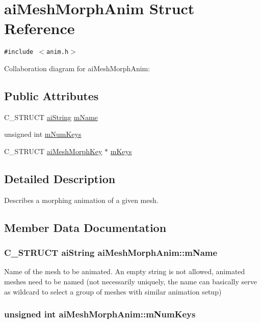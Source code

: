 \hypertarget{structai_mesh_morph_anim}{
\section{aiMeshMorphAnim Struct Reference}
\label{structai_mesh_morph_anim}
}
{\tt \#include $<$anim.h$>$}

Collaboration diagram for aiMeshMorphAnim:\subsection*{Public Attributes}
\begin{CompactItemize}
\item 
C\_\-STRUCT \hyperlink{structai_string}{aiString} \hyperlink{structai_mesh_morph_anim_21de91fb9c9fcf58a0bd0c761ea25cf5}{mName}
\item 
unsigned int \hyperlink{structai_mesh_morph_anim_f9c8a3e37613a196ed33d2746cf6f0c8}{mNumKeys}
\item 
C\_\-STRUCT \hyperlink{structai_mesh_morph_key}{aiMeshMorphKey} $\ast$ \hyperlink{structai_mesh_morph_anim_0d4f98ee7eb4e2aaabf31eba48bd14c2}{mKeys}
\end{CompactItemize}


\subsection{Detailed Description}
Describes a morphing animation of a given mesh. 

\subsection{Member Data Documentation}
\hypertarget{structai_mesh_morph_anim_21de91fb9c9fcf58a0bd0c761ea25cf5}{
\subsubsection[mName]{\setlength{\rightskip}{0pt plus 5cm}C\_\-STRUCT {\bf aiString} {\bf aiMeshMorphAnim::mName}}}
\label{structai_mesh_morph_anim_21de91fb9c9fcf58a0bd0c761ea25cf5}


Name of the mesh to be animated. An empty string is not allowed, animated meshes need to be named (not necessarily uniquely, the name can basically serve as wildcard to select a group of meshes with similar animation setup) \hypertarget{structai_mesh_morph_anim_f9c8a3e37613a196ed33d2746cf6f0c8}{
\subsubsection[mNumKeys]{\setlength{\rightskip}{0pt plus 5cm}unsigned int {\bf aiMeshMorphAnim::mNumKeys}}}
\label{structai_mesh_morph_anim_f9c8a3e37613a196ed33d2746cf6f0c8}


